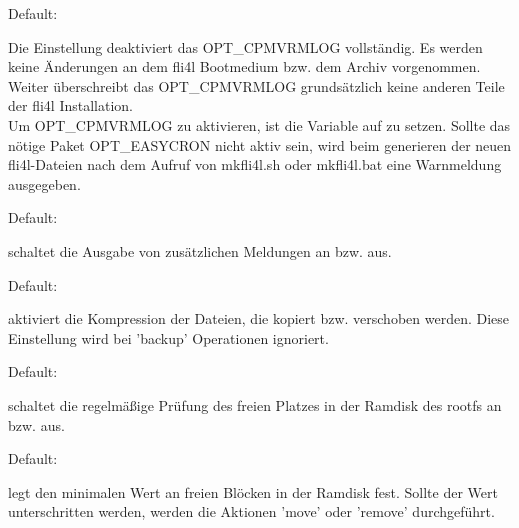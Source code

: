 \begin{description}


  Default: 

  Die Einstellung  deaktiviert das OPT\_CPMVRMLOG vollständig. Es werden
  keine Änderungen an dem fli4l Bootmedium bzw. dem Archiv 
  vorgenommen. Weiter überschreibt das OPT\_CPMVRMLOG grundsätzlich keine anderen
  Teile der fli4l Installation.\\
  Um OPT\_CPMVRMLOG zu aktivieren, ist die Variable  auf 
   zu setzen. Sollte das nötige Paket OPT\_EASYCRON nicht aktiv sein,
  wird beim generieren der neuen fli4l-Dateien nach dem Aufruf von mkfli4l.sh
  oder mkfli4l.bat eine Warnmeldung ausgegeben.

  

  Default: 

   schaltet die Ausgabe von zusätzlichen Meldungen
  an bzw. aus.\\


  Default: 
  
   aktiviert die Kompression der Dateien, die kopiert bzw. 
  verschoben werden. Diese Einstellung wird bei 'backup' Operationen ignoriert.\\
 

  Default: 

   schaltet die regelmäßige Prüfung des freien Platzes
  in der Ramdisk des rootfs an bzw. aus.\\
  

  Default: 

   legt den minimalen Wert an freien Blöcken in der
  Ramdisk fest. Sollte der Wert unterschritten werden, werden die Aktionen 'move'
  oder 'remove' durchgeführt.\\


\end{description}
